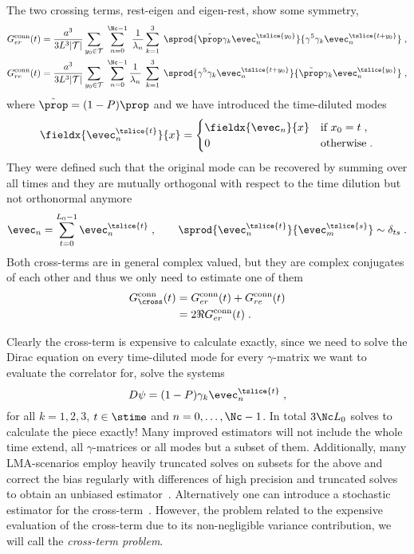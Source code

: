 The two crossing terms, rest-eigen and eigen-rest, show some symmetry,
\begin{align}
G_{er}^{\text{conn}}(t) &=
\frac{a^{3}}{3 L^{3} \lvert \mathcal{T} \rvert}
\sum_{y_0 \in \mathcal{T}} \;
\sum_{n=0}^{\Nc-1} \; \frac{1}{\lambda_{n}}
\sum_{k=1}^{3} \;
\sprod{
  \tilde{\prop}
  \gamma_k
  \evec_{n}^{\tslice{y_0}}
}{
  \gamma^{5}
  \gamma_k
  \evec_{n}^{\tslice{t+y_0}}
} \;, \\
G_{re}^{\text{conn}}(t) &=
\frac{a^{3}}{3 L^{3} \lvert \mathcal{T} \rvert}
\sum_{y_0 \in \mathcal{T}} \;
\sum_{n=0}^{\Nc-1} \frac{1}{\lambda_{n}} \;
\sum_{k=1}^{3} \;
\sprod{
  \gamma^{5}
  \gamma_k
  \evec_{n}^{\tslice{t+y_0}}
}{
  \tilde{\prop}
  \gamma_k
  \evec_{n}^{\tslice{y_0}}
} \;,
\end{align}
where $\tilde{\prop} = (1-P) \prop$ and we have introduced the time-diluted modes
\begin{equation}
\fieldx{\evec_{n}^{\tslice{t}}}{x} =
\begin{cases}
  \fieldx{\evec_{n}}{x} & \text{if } x_0 = t \;, \\
  0 & \text{otherwise} \;.
\end{cases} 
\end{equation}
They were defined such that the original mode can be recovered by summing over all times and they are mutually orthogonal with respect to the time dilution but not orthonormal anymore
\begin{equation}
\evec_{n} = \sum_{t=0}^{L_0-1} \evec_{n}^{\tslice{t}} \;,
\qquad
\sprod{\evec_{n}^{\tslice{t}}}{\evec_{m}^{\tslice{s}}} \sim \delta_{ts} \;. %
\end{equation}
Both cross-terms are in general complex valued, but they are complex conjugates of each other and thus we only need to estimate one of them
\begin{align}
G_{\cross}^{\text{conn}}(t)
&= G_{er}^{\text{conn}}(t) + G_{re}^{\text{conn}}(t) \\
&= 2 \Re{G_{er}^{\text{conn}}(t)} \;.
\end{align}

Clearly the cross-term is expensive to calculate exactly, since we need to solve the Dirac equation on every time-diluted mode for every $\gamma$-matrix we want to evaluate the correlator for, \ie solve the systems
\begin{equation}
D \psi = (1-P) \gamma_k \evec_{n}^{\tslice{t}} \;,
\end{equation}
for all $k = 1,2,3$, $t \in \stime$ and $n = 0, \ldots, \Nc-1$.
In total $3 \Nc L_0$ solves to calculate the piece exactly!
Many improved estimators will not include the whole time extend, all $\gamma$-matrices or all modes but a subset of them.
Additionally, many LMA-scenarios employ heavily truncated solves on subsets for the above and correct the bias regularly with differences of high precision and truncated solves to obtain an unbiased estimator~\cite{bmw_2017,Kuberski_2023}.
Alternatively one can introduce a stochastic estimator for the cross-term~\cite{lynch2023,fermi_2023}.
However, the problem related to the expensive evaluation of the cross-term due to its non-negligible variance contribution, we will call the \emph{cross-term problem}.

